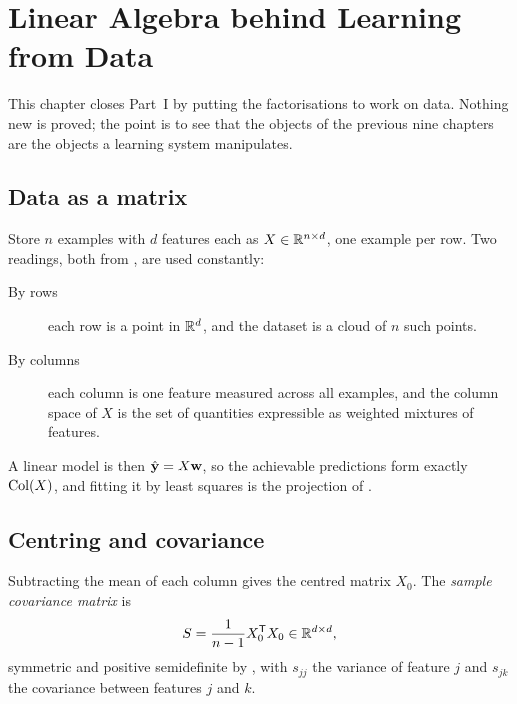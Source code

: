 \setchapterpreamble[u]{\margintoc}
\chapter{Linear Algebra behind Learning from Data}


This chapter closes Part~I by putting the factorisations to work on data. Nothing
new is proved; the point is to see that the objects of the previous nine
chapters are the objects a learning system manipulates.

\section{Data as a matrix}

Store \(n\) examples with \(d\) features each as \(X\in\mathbb{R}^{n\times d}\), one
example per row. Two readings, both from , are used
constantly:

\begin{description}
	\item[By rows] each row is a point in \(\mathbb{R}^{d}\), and the dataset is a cloud
	of \(n\) such points.
	\item[By columns] each column is one feature measured across all examples,
	and the column space of \(X\) is the set of quantities expressible as
	weighted mixtures of features.
\end{description}

A linear model is then \(\hat{\mathbf{y}}=X\mathbf{w}\), so the achievable
predictions form exactly \(\operatorname{Col}(X)\), and fitting it by least squares is the
projection of .


\section{Centring and covariance}

Subtracting the mean of each column gives the centred matrix \(X_0\). The
\emph{sample covariance matrix} is
\[
	S=\frac{1}{n-1}X_0^{\mathsf{T}} X_0\in\mathbb{R}^{d\times d},
\]
symmetric and positive semidefinite by , with
\(s_{jj}\) the variance of feature \(j\) and \(s_{jk}\) the covariance between
features \(j\) and \(k\).

